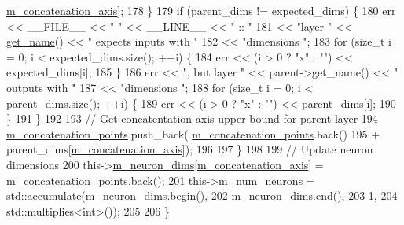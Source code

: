 \begin{DoxyCode}
      \hyperlink{classlbann_1_1concatenation__layer_a4ac4a931dc85d622e9ea8fddb9625d38}{m\_concatenation\_axis}];
178       \}
179       \textcolor{keywordflow}{if} (parent\_dims != expected\_dims) \{
180         err << \_\_FILE\_\_ << \textcolor{stringliteral}{" "} << \_\_LINE\_\_ << \textcolor{stringliteral}{" :: "}
181             << \textcolor{stringliteral}{"layer "} << \hyperlink{classlbann_1_1Layer_a80027550202fa7dbb1dd55fa8a66c84b}{get\_name}() << \textcolor{stringliteral}{" expects inputs with "}
182             << \textcolor{stringliteral}{"dimensions "};
183         \textcolor{keywordflow}{for} (\textcolor{keywordtype}{size\_t} i = 0; i < expected\_dims.size(); ++i) \{
184           err << (i > 0 ? \textcolor{stringliteral}{"x"} : \textcolor{stringliteral}{""}) << expected\_dims[i];
185         \}
186         err << \textcolor{stringliteral}{", but layer "} << parent->get\_name() << \textcolor{stringliteral}{" outputs with "}
187             << \textcolor{stringliteral}{"dimensions "};
188         \textcolor{keywordflow}{for} (\textcolor{keywordtype}{size\_t} i = 0; i < parent\_dims.size(); ++i) \{
189           err << (i > 0 ? \textcolor{stringliteral}{"x"} : \textcolor{stringliteral}{""}) << parent\_dims[i];
190         \}
191       \}
192 
193       \textcolor{comment}{// Get concatentation axis upper bound for parent layer}
194       \hyperlink{classlbann_1_1concatenation__layer_a363324fe6cd104740334f3396085328c}{m\_concatenation\_points}.push\_back(
      \hyperlink{classlbann_1_1concatenation__layer_a363324fe6cd104740334f3396085328c}{m\_concatenation\_points}.back()
195                                        + parent\_dims[\hyperlink{classlbann_1_1concatenation__layer_a4ac4a931dc85d622e9ea8fddb9625d38}{m\_concatenation\_axis}]);
196 
197     \}    
198 
199     \textcolor{comment}{// Update neuron dimensions}
200     this->\hyperlink{classlbann_1_1Layer_abb34bb8031f57a483e2e327a5f229f48}{m\_neuron\_dims}[\hyperlink{classlbann_1_1concatenation__layer_a4ac4a931dc85d622e9ea8fddb9625d38}{m\_concatenation\_axis}] = 
      \hyperlink{classlbann_1_1concatenation__layer_a363324fe6cd104740334f3396085328c}{m\_concatenation\_points}.back();
201     this->\hyperlink{classlbann_1_1Layer_a6b5ebc8a7d9329d8a773ed787e7b41d8}{m\_num\_neurons} = std::accumulate(\hyperlink{classlbann_1_1Layer_abb34bb8031f57a483e2e327a5f229f48}{m\_neuron\_dims}.begin(),
202                                           \hyperlink{classlbann_1_1Layer_abb34bb8031f57a483e2e327a5f229f48}{m\_neuron\_dims}.end(),
203                                           1,
204                                           std::multiplies<int>());
205 
206   \}
\end{DoxyCode}
